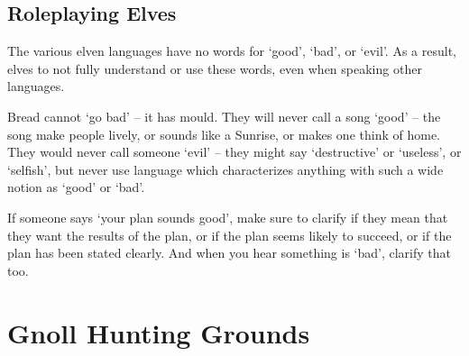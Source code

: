 \begin{multicols}{2}
\subsection{Roleplaying Elves}

The various elven languages have no words for `good', `bad', or `evil'.
As a result, elves to not fully understand or use these words, even when speaking other languages.

Bread cannot `go bad' -- it has mould.
They will never call a song `good' -- the song make people lively, or sounds like a Sunrise, or makes one think of home.
They would never call someone `evil' -- they might say `destructive' or `useless', or `selfish', but never use language which characterizes anything with such a wide notion as `good' or `bad'.

If someone says `your plan sounds good', make sure to clarify if they mean that they want the results of the plan, or if the plan seems likely to succeed, or if the plan has been stated clearly.
And when you hear something is `bad', clarify that too.

\end{multicols}

\section[Gnolls]{Gnoll Hunting Grounds \Nl}

